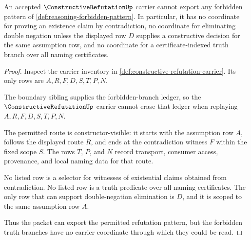 \begin{theorem}
\label{thm:constructive-refutation-forbidden-branch-exclusion}
An accepted $\ConstructiveRefutationUp$ carrier cannot export any forbidden pattern of \autoref{def:reasoning-forbidden-pattern}. In particular, it has no coordinate for proving an existence claim by contradiction, no coordinate for eliminating double negation unless the displayed row $D$ supplies a constructive decision for the same assumption row, and no coordinate for a certificate-indexed truth branch over all naming certificates.
\end{theorem}
\begin{proof}
Inspect the carrier inventory in \autoref{def:constructive-refutation-carrier}. Its only rows are $A,R,F,D,S,T,P,N$.

The boundary sibling supplies the forbidden-branch ledger, so the $\ConstructiveRefutationUp$ carrier cannot erase that ledger when replaying $A,R,F,D,S,T,P,N$.

The permitted route is constructor-visible: it starts with the assumption row $A$, follows the displayed route $R$, and ends at the contradiction witness $F$ within the fixed scope $S$. The rows $T$, $P$, and $N$ record transport, consumer access, provenance, and local naming data for that route.

No listed row is a selector for witnesses of existential claims obtained from contradiction. No listed row is a truth predicate over all naming certificates. The only row that can support double-negation elimination is $D$, and it is scoped to the same assumption row $A$.

Thus the packet can export the permitted refutation pattern, but the forbidden truth branches have no carrier coordinate through which they could be read.
\end{proof}


\begin{closurestatus}{\ConstructiveRefutationUp}
  \theoryclosure{\seedClosure}
  \formalstatus{\unformalizedV}
\end{closurestatus}
